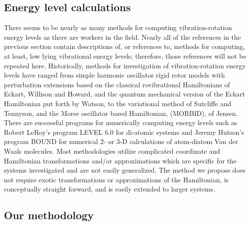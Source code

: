\documentclass[12pt,thmsa]{article}
\begin{document}
\subsection{Energy level calculations}

There seems to be nearly as many methods for computing vibration-rotation
energy levels as there are workers in the field. Nearly all of the
references in the previous section contain descriptions of, or references
to, methods for computing, at least, low lying vibrational energy levels;
therefore, those references will not be repeated here. Historically, methods
for investigation of vibration-rotation energy levels have ranged from
simple harmonic oscillator rigid rotor models with perturbation extensions
based on the classical rovibrational Hamiltonians of Eckart\cite{Eckart35},
Willison and Howard\cite{WilsonHoward36}, and the quantum mechanical version
of the Eckart Hamiltonian put forth by Watson\cite{Watson68}, to the
variational method of Sutcliffe and Tennyson\cite{SutcliffeTennyson87}, and
the Morse oscillator based Hamiltonian, (MORBID), of Jensen\cite{Jensen88}.
There are successful programs for numerically computing energy levels such
as Robert LeRoy's program LEVEL 6.0\cite{LeRoy95} for di-atomic systems and
Jeremy Hutson's program BOUND\cite{Hutson93} for numerical 2- or 3-D
calculations of atom-diatom Van der Waals molecules. Most methodologies
utilize complicated coordinate and Hamiltonian transformations and/or
approximations which are specific for the systems investigated and are not
easily generalized. The method we propose does not require exotic
transformations or approximations of the Hamiltonian, is conceptually
straight forward, and is easily extended to larger systems.

\subsection{Our methodology}
\end{document}
